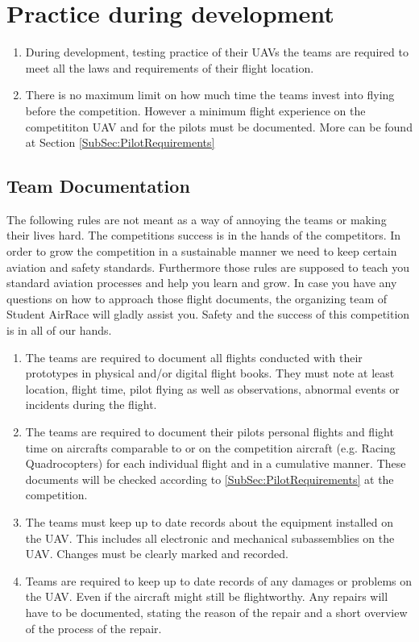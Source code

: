     \section{Practice during development}
    \begin{enumerate}
      \item During development, testing practice of their UAVs the teams are required to meet all the laws and requirements of their flight location. 
      \item There is no maximum limit on how much time the teams invest into flying before the competition. However a minimum flight experience on the competititon UAV and for the pilots must be documented. More can be found at Section \ref{SubSec:PilotRequirements}
    \end{enumerate}

    \subsection{Team Documentation}
    The following rules are not meant as a way of annoying the teams or making their lives hard. The competitions success is in the hands of the competitors. In order to grow the competition 
    in a sustainable manner we need to keep certain aviation and safety standards. Furthermore those rules are supposed to teach you standard aviation processes and help you learn and grow. 
    In case you have any questions on how to approach those flight documents, the organizing team of Student AirRace will gladly assist you. Safety and the success of this competition is in all of our hands.
    \begin{enumerate}
      \item The teams are required to document all flights conducted with their prototypes in physical and/or digital flight books. They must note at least location, flight time, pilot flying 
      as well as observations, abnormal events or incidents during the flight.
      \item The teams are required to document their pilots personal flights and flight time on aircrafts comparable to or on the competition aircraft (e.g. Racing Quadrocopters)
      for each individual flight and in a cumulative manner. These documents will be checked according to \ref{SubSec:PilotRequirements} at the competition. 
      \item The teams must keep up to date records about the equipment installed on the UAV. This includes all electronic and mechanical subassemblies on the UAV. 
      Changes must be clearly marked and recorded. 
      \item Teams are required to keep up to date records of any damages or problems on the UAV. Even if the aircraft might still be flightworthy. 
      Any repairs will have to be documented, stating the reason of the repair and a short overview of the process of the repair. 
    \end{enumerate}

